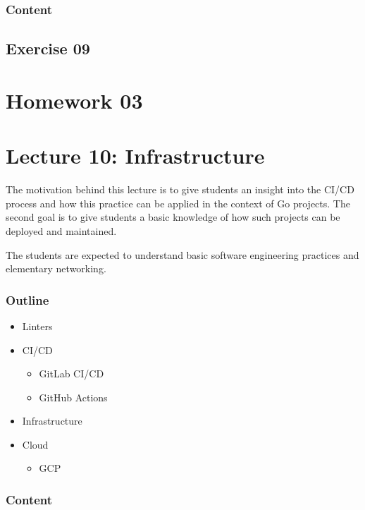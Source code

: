 \documentclass[
  digital,
  color,
  oneside,
  nosansbold,
  nocolorbold,
  lof,
  lot,
]{fithesis4}
\begin{document}
\subsubsection{Content}

\subsection{Exercise 09}

\section{Homework 03}

\section{Lecture 10: Infrastructure}

The motivation behind this lecture is to give students an insight into the CI/CD process and how this practice can be applied in the context of Go projects. The second goal is to give students a basic knowledge of how such projects can be deployed and maintained.

The students are expected to understand basic software engineering practices and elementary networking.

\subsubsection{Outline}

\begin{itemize}
    \item Linters
    \item CI/CD
    \begin{itemize}
        \item GitLab CI/CD
        \item GitHub Actions
    \end{itemize}
    \item Infrastructure
    \item Cloud
    \begin{itemize}
        \item GCP
    \end{itemize}
\end{itemize}

\subsubsection{Content}
\end{document}
